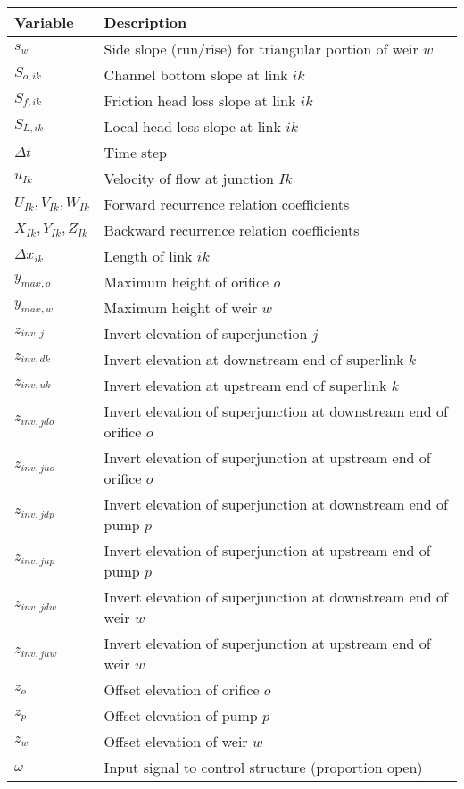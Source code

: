 \documentclass[11pt]{article}
\begin{document}
\begin{table}[!htb]
  \centering
  \begin{tabular}{l | l}
    \hline
    Variable & Description \\
    \hline
    $s_w$ & Side slope (run/rise) for triangular portion of weir $w$ \\
    $S_{o,ik}$ & Channel bottom slope at link $ik$ \\
    $S_{f,ik}$ & Friction head loss slope at link $ik$ \\
    $S_{L,ik}$ & Local head loss slope at link $ik$ \\
    $\Delta t$ & Time step \\
    $u_{Ik}$ & Velocity of flow at junction $Ik$ \\
    $U_{Ik}, V_{Ik}, W_{Ik}$ & Forward recurrence relation coefficients \\
    $X_{Ik}, Y_{Ik}, Z_{Ik}$ & Backward recurrence relation coefficients \\
    $\Delta x_{ik}$ & Length of link $ik$ \\
    $y_{max,o}$ & Maximum height of orifice $o$ \\
    $y_{max,w}$ & Maximum height of weir $w$ \\
    $z_{inv, j}$ & Invert elevation of superjunction $j$ \\
    $z_{inv, dk}$ & Invert elevation at downstream end of superlink $k$ \\
    $z_{inv, uk}$ & Invert elevation at upstream end of superlink $k$ \\
    $z_{inv, jdo}$ & Invert elevation of superjunction at downstream end of orifice $o$ \\
    $z_{inv, juo}$ & Invert elevation of superjunction at upstream end of orifice $o$ \\
    $z_{inv, jdp}$ & Invert elevation of superjunction at downstream end of pump $p$ \\
    $z_{inv, jup}$ & Invert elevation of superjunction at upstream end of pump $p$ \\
    $z_{inv, jdw}$ & Invert elevation of superjunction at downstream end of weir $w$ \\
    $z_{inv, juw}$ & Invert elevation of superjunction at upstream end of weir $w$ \\
    $z_o$ & Offset elevation of orifice $o$ \\
    $z_p$ & Offset elevation of pump $p$ \\
    $z_w$ & Offset elevation of weir $w$ \\
    $\omega$ & Input signal to control structure (proportion open) \\
    \hline
  \end{tabular}
\end{table}
\end{document}
